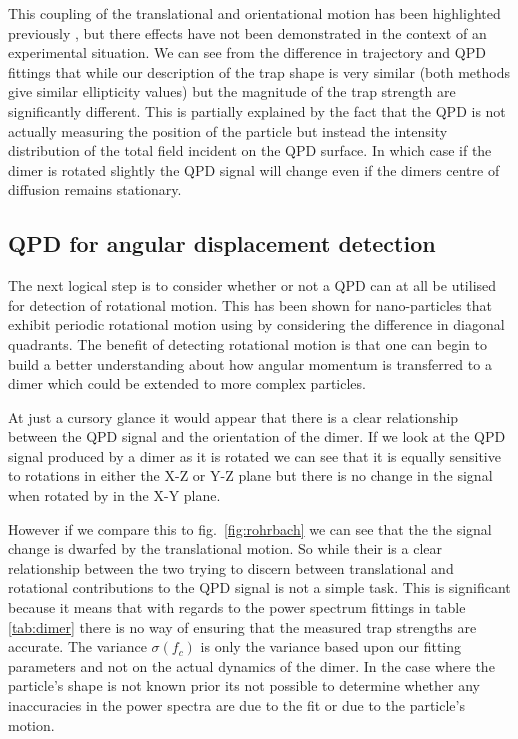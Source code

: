 This coupling of the translational and orientational motion 
has been highlighted previously \cite{Vigilante2020}, but 
there effects have not been demonstrated in the context of
an experimental situation. We can see from the difference in
trajectory and QPD fittings that while our description of the
trap shape is very similar (both methods give similar ellipticity
values) but the magnitude of the trap strength are significantly
different. This is partially explained by the fact that the
QPD is not actually measuring the position of the particle
but instead the intensity distribution of the total field 
incident on the QPD surface. In which case if the dimer is 
rotated slightly the QPD signal will change even if the dimers
centre of diffusion remains stationary. 

\subsection{QPD for angular displacement detection}
The next logical step is to consider whether or not a QPD can at 
all be utilised for detection of rotational motion. This has been
shown for nano-particles that exhibit periodic rotational motion
using by considering the difference in diagonal quadrants. The 
benefit of detecting rotational motion is that one can begin to 
build a better understanding about how angular momentum is 
transferred to a dimer which could be extended to more complex
particles. 

At just a cursory glance it would appear that there is a clear
relationship between the QPD signal and the orientation of the 
dimer. If we look at the QPD signal produced by a dimer as it is 
rotated we can see that it is equally sensitive to rotations in
either the X-Z or Y-Z plane but there is no change in the signal 
when rotated by in the X-Y plane. 

However if we compare this to fig.~\ref{fig:rohrbach} we can see 
that the the signal change is dwarfed by the translational motion. 
So while their is a clear relationship between the two trying to
discern between translational and rotational contributions to the
QPD signal is not a simple task. This is significant because it 
means that with regards to the power spectrum fittings in table 
\ref{tab:dimer} there is no way of ensuring that the measured 
trap strengths are accurate. The variance $\sigma(f_c)$ is only 
the variance based upon our fitting parameters and not on the 
actual dynamics of the dimer. In the case where the particle's
shape is not known prior its not possible to determine whether 
any inaccuracies in the power spectra are due to the fit or due
to the particle's motion.

